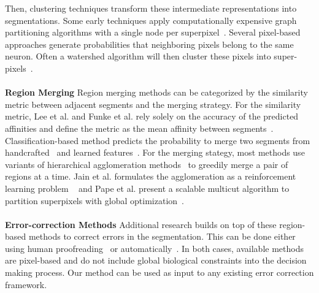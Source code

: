 Then, clustering techniques transform these intermediate representations into segmentations.
Some early techniques apply computationally expensive graph partitioning algorithms with a single node per superpixel~\cite{andres2012globally}.
Several pixel-based approaches generate probabilities that neighboring pixels belong to the same neuron.
Often a watershed algorithm will then cluster these pixels into super-pixels~\cite{zlateski2015image}.
\\~\\
\noindent\textbf{Region Merging}
Region merging methods can be categorized by the similarity metric between adjacent segments and the merging strategy.
For the similarity metric, Lee et al. and Funke et al. rely solely on the accuracy of the predicted affinities and define the metric as the mean affinity between segments~\cite{lee2017superhuman,funke2017deep}.
Classification-based method predicts the probability to merge two segments from handcrafted~\cite{seymour2016rhoananet,nunez2014graph,parag2017anisotropic,zlateski2015image,10.1371/journal.pone.0125825,jain2011learning} and learned features~\cite{bogovic2013learned}. 
For the merging stategy, most methods use variants of hierarchical agglomeration methods~\cite{seymour2016rhoananet,nunez2014graph,parag2017anisotropic,zlateski2015image,10.1371/journal.pone.0125825} to greedily merge a pair of regions at a time.
Jain et al. formulates the agglomeration as a reinforcement learning problem ~\cite{jain2011learning} and Pape et al. present a scalable multicut algorithm to partition superpixels with global optimization~\cite{beier2017multicut}.
\\~\\
\noindent\textbf{Error-correction Methods}
 Additional research builds on top of these region-based methods to correct errors in the segmentation. This can be done either using human proofreading~\cite{haehn2014design,haehn2017guided,mojo2} or automatically~\cite{rolnick2017morphological,error_correction_using_CNN}. In both cases, available methods are pixel-based and do not include global biological constraints into the decision making process. Our method can be used as input to any existing error correction framework.




